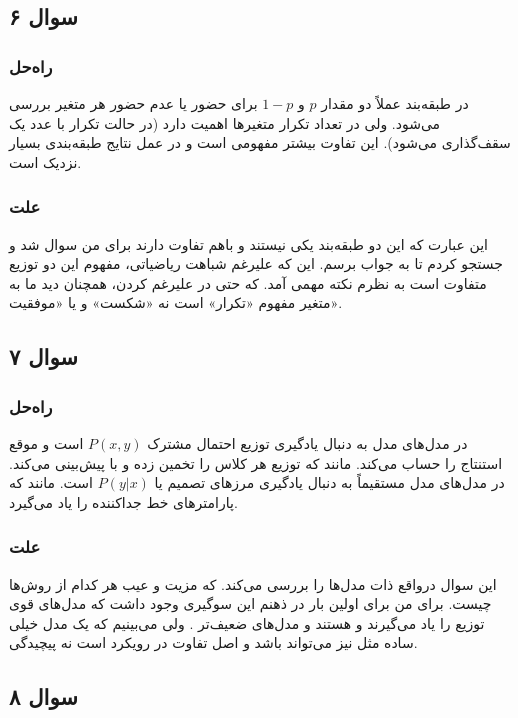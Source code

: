 \documentclass[12pt]{article}
\begin{document}
	\subsection*{سوال ۶}
	\subsubsection*{راه‌حل}
	در طبقه‌بند 
	عملاً دو مقدار 
	$p$
	و
	$1 - p$
	برای حضور یا عدم حضور هر متغیر بررسی می‌شود. ولی در 
	تعداد تکرار متغیرها اهمیت دارد (در حالت  تکرار با عدد یک سقف‌گذاری می‌شود). این تفاوت بیشتر مفهومی است و در عمل نتایج طبقه‌بندی بسیار نزدیک است.
	\subsubsection*{علت}
	این عبارت که این دو طبقه‌بند یکی نیستند و باهم تفاوت دارند برای من سوال شد و جستجو کردم تا به جواب برسم. این که علیرغم شباهت ریاضیاتی، مفهوم این دو توزیع متفاوت است به نظرم نکته مهمی آمد. که حتی در 
	علیرغم 
	کردن، همچنان دید ما به متغیر مفهوم «تکرار» است نه «شکست» و یا «موفقیت».
	\subsection*{سوال ۷}
	\subsubsection*{راه‌حل}
	در مدل‌های 
	مدل به دنبال یادگیری توزیع احتمال مشترک $P(x, y)$ است و موقع استنتاج 
	را حساب می‌کند. مانند 
	که توزیع هر کلاس را تخمین زده و با 
	پیش‌بینی می‌کند.
	در مدل‌های 
	مدل مستقیماً به دنبال یادگیری مرزهای تصمیم یا $P(y|x)$ است. مانند 
	که پارامترهای خط جداکننده را یاد می‌گیرد.
	\subsubsection*{علت}
	این سوال درواقع ذات مدل‌ها را بررسی می‌کند. که مزیت و عیب هر کدام از روش‌ها چیست. برای من برای اولین بار در ذهنم این سوگیری وجود داشت که مدل‌های قوی 
	توزیع را یاد می‌گیرند و 
	هستند و مدل‌های ضعیف‌تر 
	. ولی می‌بینیم که یک مدل خیلی ساده مثل 
	نیز می‌تواند  باشد و اصل تفاوت در رویکرد است نه پیچیدگی.
	\subsection*{سوال ۸}
\end{document}
